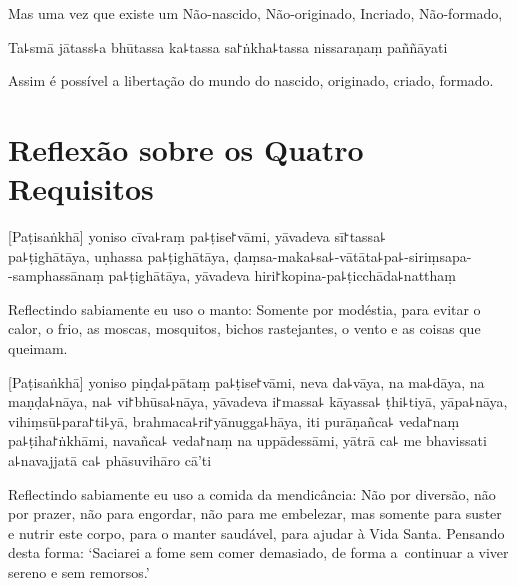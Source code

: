 \documentclass[
  babelLanguage=english,
  final,
  webversion,
]{chantingbook}
\begin{document}
\begin{english}
  Mas uma vez que existe um Não-nascido, Não-originado, Incriado, Não-formado,
\end{english}

Ta꜕smā jātass꜕a bhūtassa ka꜕tassa sa꜓ṅkha꜕tassa nissaraṇaṃ paññāyati

\begin{english}
  Assim é possível a libertação do mundo do nascido, originado, criado, formado.
\end{english}

\chapter[Quatro Requisitos]{Reflexão sobre os Quatro Requisitos}


\begin{leader}
\end{leader}

[Paṭisaṅkhā] yoniso cīva꜕raṃ pa꜕ṭise꜓vāmi, yāvadeva sī꜓tassa꜕\\
pa꜕ṭighātāya, uṇhassa pa꜕ṭighātāya, ḍaṃsa-maka꜕sa꜕-vātāta꜕pa꜕-siriṃsapa-\\
-samphassānaṃ pa꜕ṭighātāya, yāvadeva hiri꜓kopina-pa꜕ṭicchāda꜕natthaṃ

\begin{english}
  Reflectindo sabiamente eu uso o manto: Somente por modéstia, para evitar o
  calor, o frio, as moscas, mosquitos, bichos rastejantes, o vento e as coisas
  que queimam.
\end{english}

[Paṭisaṅkhā] yoniso piṇḍa꜕pātaṃ pa꜕ṭise꜓vāmi, neva da꜕vāya, na ma꜕dāya, na maṇḍa꜕nāya, na꜕ vi꜓bhūsa꜕nāya, yāvadeva i꜓massa꜕ kāyassa꜕ ṭhi꜕tiyā, yāpa꜕nāya, vihiṃsū꜕para꜓ti꜕yā, brahmaca꜕ri꜓yānugga꜕hāya, iti purāṇañca꜕ veda꜓naṃ pa꜕ṭiha꜓ṅkhāmi, navañca꜕ veda꜓naṃ na uppādessāmi, yātrā ca꜕ me bhavissati a꜕navajjatā ca꜕ phāsuvihāro cā'ti

\begin{english}
  Reflectindo sabiamente eu uso a comida da mendicância: Não por diversão, não por
  prazer, não para engordar, não para me embelezar, mas somente para suster e
  nutrir este corpo, para o manter saudável, para ajudar à Vida Santa. Pensando
  desta forma: `Saciarei a fome sem comer demasiado, de forma
  a~continuar a viver sereno e sem remorsos.'
\end{english}
\end{document}
